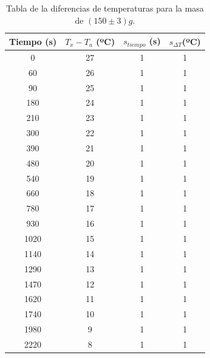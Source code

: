 \documentclass[a4paper]{article}
\begin{document}
\begin{table}[H]
  \centering
    \begin{tabular}{|c|c|c|c|} \hline
    Tiempo (s) & $T_x - T_a$ (ºC) & $s_{tiempo }$ (s) &  $s_{ \Delta T} $(ºC) \\ \hline
    0     & 27    & 1     & 1 \\ \hline
    60    & 26    & 1     & 1 \\ \hline
    90    & 25    & 1     & 1 \\ \hline
    180   & 24    & 1     & 1 \\ \hline
    210   & 23    & 1     & 1 \\ \hline
    300   & 22    & 1     & 1 \\ \hline
    390   & 21    & 1     & 1 \\ \hline
    480   & 20    & 1     & 1 \\ \hline
    540   & 19    & 1     & 1 \\ \hline
    660   & 18    & 1     & 1 \\ \hline
    780   & 17    & 1     & 1 \\ \hline
    930   & 16    & 1     & 1 \\ \hline
    1020  & 15    & 1     & 1 \\ \hline
    1140  & 14    & 1     & 1 \\ \hline
    1290  & 13    & 1     & 1 \\ \hline
    1470  & 12    & 1     & 1 \\ \hline
    1620  & 11    & 1     & 1 \\ \hline
    1740  & 10    & 1     & 1 \\ \hline
    1980  & 9     & 1     & 1 \\ \hline
    2220  & 8     & 1     & 1 \\ \hline
    \end{tabular}%
  \caption{Tabla de la diferencias de temperaturas para la masa de $(150\pm 3)g$.}
\end{table}%
\end{document}
